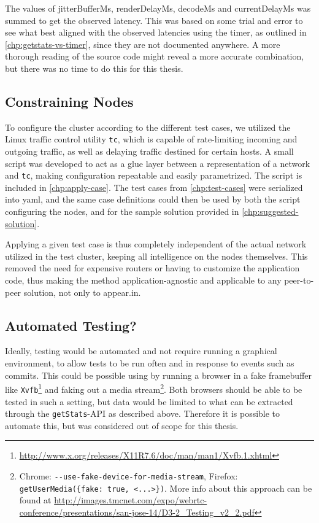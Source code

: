 The values of jitterBufferMs, renderDelayMs, decodeMs and currentDelayMs was summed to get the observed latency. This was based on some trial and error to see what best aligned with the observed latencies using the timer, as outlined in \autoref{chp:getstats-vs-timer}, since they are not documented anywhere. A more thorough reading of the source code might reveal a more accurate combination, but there was no time to do this for this thesis.


\subsection{Constraining Nodes}

To configure the cluster according to the different test cases, we utilized the Linux traffic control utility \texttt{tc}, which is capable of rate-limiting incoming and outgoing traffic, as well as delaying traffic destined for certain hosts. A small script was developed to act as a glue layer between a representation of a network and \texttt{tc}, making configuration repeatable and easily parametrized. The script is included in \autoref{chp:apply-case}. The test cases from \autoref{chp:test-cases} were serialized into \gls{yaml}, and the same case definitions could then be used by both the script configuring the nodes, and for the sample solution provided in \autoref{chp:suggested-solution}.

Applying a given test case is thus completely independent of the actual network utilized in the test cluster, keeping all intelligence on the nodes themselves. This removed the need for expensive routers or having to customize the application code, thus making the method application-agnostic and applicable to any peer-to-peer solution, not only to appear.in.


\subsection{Automated Testing?}\label{subsec:automated-testing}

Ideally, testing would be automated and not require running a graphical environment, to allow tests to be run often and in response to events such as commits. This could be possible using by running a browser in a fake framebuffer like \texttt{Xvfb}\footnote{\url{http://www.x.org/releases/X11R7.6/doc/man/man1/Xvfb.1.xhtml}} and faking out a media stream\footnote{Chrome: \texttt{-{}-use-fake-device-for-media-stream}, Firefox: \texttt{getUserMedia(\{fake: true, <...>\})}. More info about this approach can be found at \url{http://images.tmcnet.com/expo/webrtc-conference/presentations/san-jose-14/D3-2_Testing_v2_2.pdf}}. Both browsers should be able to be tested in such a setting, but data would be limited to what can be extracted through the \texttt{getStats}-API as described above. Therefore it is possible to automate this, but was considered out of scope for this thesis.


